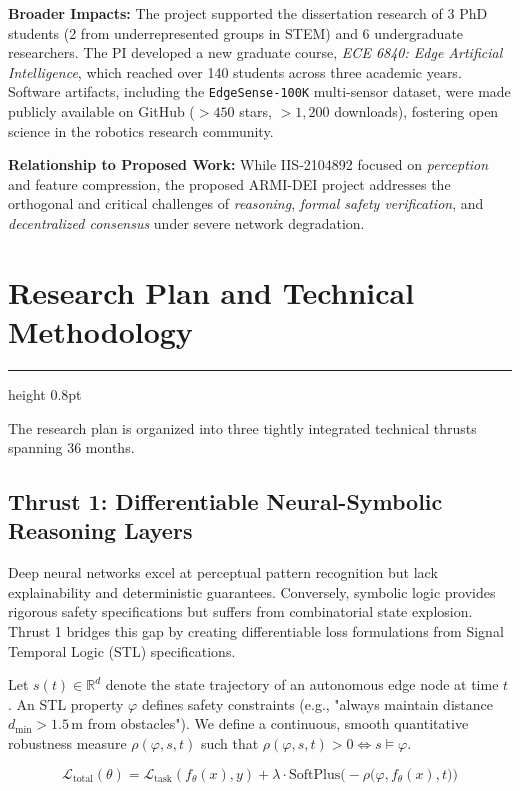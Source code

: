 \documentclass[11pt,letterpaper]{scrartcl}
\newcommand{\sectionline}{%
  \vspace{-0.5em}%
  {\color{NSFNavy}\hrule height 0.8pt}%
  \vspace{0.2em}%
}
\begin{document}
\textbf{Broader Impacts:} The project supported the dissertation research of 3 PhD students (2 from underrepresented groups in STEM) and 6 undergraduate researchers. The PI developed a new graduate course, \emph{ECE 6840: Edge Artificial Intelligence}, which reached over 140 students across three academic years. Software artifacts, including the \texttt{EdgeSense-100K} multi-sensor dataset, were made publicly available on GitHub ($>450$ stars, $>1,200$ downloads), fostering open science in the robotics research community.

\textbf{Relationship to Proposed Work:} While IIS-2104892 focused on \emph{perception} and feature compression, the proposed ARMI-DEI project addresses the orthogonal and critical challenges of \emph{reasoning}, \emph{formal safety verification}, and \emph{decentralized consensus} under severe network degradation.

\section{Research Plan and Technical Methodology}
\sectionline

The research plan is organized into three tightly integrated technical thrusts spanning 36 months.

\subsection{Thrust 1: Differentiable Neural-Symbolic Reasoning Layers}
Deep neural networks excel at perceptual pattern recognition but lack explainability and deterministic guarantees. Conversely, symbolic logic provides rigorous safety specifications but suffers from combinatorial state explosion. Thrust 1 bridges this gap by creating differentiable loss formulations from Signal Temporal Logic (STL) specifications.

Let $s(t) \in \mathbb{R}^d$ denote the state trajectory of an autonomous edge node at time $t$. An STL property $\varphi$ defines safety constraints (e.g., "always maintain distance $d_{\text{min}} > 1.5$\,m from obstacles"). We define a continuous, smooth quantitative robustness measure $\rho(\varphi, s, t)$ such that $\rho(\varphi, s, t) > 0 \iff s \models \varphi$. 

\begin{equation}
    \mathcal{L}_{\text{total}}(\theta) = \mathcal{L}_{\text{task}}(f_\theta(x), y) + \lambda \cdot \text{SoftPlus}\Big(-\rho\big(\varphi, f_\theta(x), t\big)\Big)
    \label{eq:stl_loss}
\end{equation}
\end{document}
